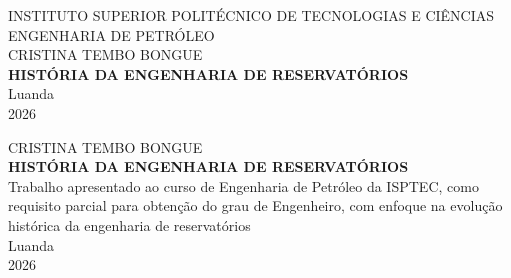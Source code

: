 \documentclass[12pt,a4paper]{report}
\begin{document}
\begin{titlepage}
\centering
{\large INSTITUTO SUPERIOR POLITÉCNICO DE TECNOLOGIAS E CIÊNCIAS}\\[2cm]
{\large ENGENHARIA DE PETRÓLEO}\\[2cm]
{\large CRISTINA TEMBO BONGUE}\\[4cm]

{\LARGE \textbf{HISTÓRIA DA ENGENHARIA DE RESERVATÓRIOS}}\\[6cm]

Luanda\\
2026
\end{titlepage}

\begin{titlepage}
\centering

{\large CRISTINA TEMBO BONGUE}\\[4cm]

{\LARGE \textbf{HISTÓRIA DA ENGENHARIA DE RESERVATÓRIOS}}\\[5cm]

Trabalho apresentado ao curso de Engenharia de Petróleo da ISPTEC, como requisito parcial para obtenção do grau de Engenheiro, com enfoque na evolução histórica da engenharia de reservatórios\\[6cm]

Luanda\\
2026
\end{titlepage}

\setcounter{page}{1}  %
\end{document}
